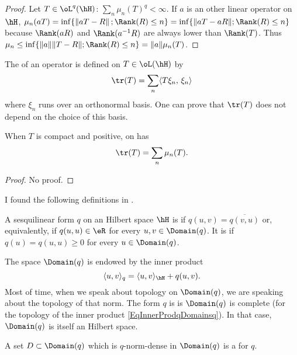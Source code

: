 \begin{proof}
Let $T\in\oL^q(\hH)$: $\sum_n\mu_n(T)^q<\infty$.  If $a$ is an other linear operator on $\hH$, $\mu_n(aT)=\inf\{ \| aT-R \|\,;\Rank(R)\leq n \}=\inf\{ \| aT-aR \|;\Rank(R)\leq n \}$ because $\Rank(aR)$ and $\Rank(a^{-1}R)$ are always lower than $\Rank(T)$. Thus $\mu_n\leq\inf\{ \| a \|\| T-R \|;\Rank(R)\leq n \}=\| a \|\mu_n(T)$.
\end{proof}

The  of an operator is defined on $T\in\oL(\hH)$ by
\begin{equation}
\tr(T)=\sum_{n}\langle T\xi_n,\,\xi_n\rangle
\end{equation}
where $\xi_n$ runs over an orthonormal basis. One can prove that $\tr(T)$ does not depend on the choice of this basis.

\begin{proposition}
When $T$ is compact and positive, on has
\[
  \tr(T)=\sum_{n}\mu_n(T).
\]

\end{proposition}
\begin{proof}
No proof.
\end{proof}

I found the following definitions in \cite{OlafPostDissertation}.
\begin{definition}
	A sesquilinear form $q$ on an Hilbert space $\hH$ is  if $q(u,v)=\overline{ q(v,u) }$ or, equivalently, if $q(u,u)\in\eR$ for every $u,v\in\Domain(q)$. It is  if $q(u)=q(u,u)\geq 0$ for every $u\in\Domain(q)$.
\end{definition}
The space $\Domain(q)$ is endowed by the inner product
\begin{equation}		\label{EqInnerProdqDomainsq}
	\langle u, v\rangle_q=\langle u, v\rangle_{\hH}+q(u,v).
\end{equation}
Most of time, when we speak about topology on $\Domain(q)$, we are speaking about the topology of that norm. The form $q$ is  is $\Domain(q)$ is complete (for the topology of the inner product \eqref{EqInnerProdqDomainsq}). In that case, $\Domain(q)$ is itself an Hilbert space.

\begin{definition}		\label{DefFormCoreDomq}
	A set $D\subset\Domain(q)$ which is $q$-norm-dense in $\Domain(q)$ is a  for $q$.
\end{definition}

